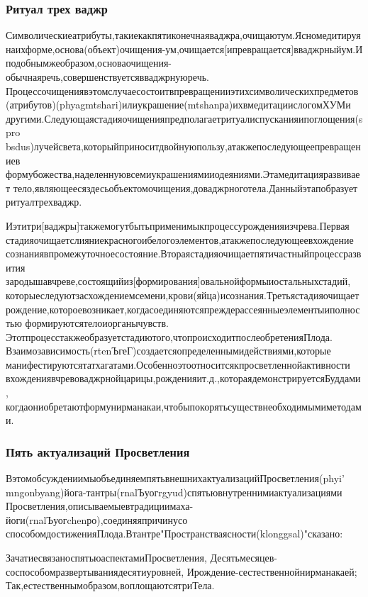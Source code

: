 {\subsubsection{Ритуал трех ваджр}

Символическиеатрибуты,такиекакпятиконечнаяваджра,очищаютум.Ясномедитируя
наихформе,основа(объект)очищения-ум,очищается[ипревращается]вваджрныйум.И
подобнымжеобразом,основаочищения-обычнаяречь,совершенствуетсявваджрнуюречь.
Процессочищениявэтомслучаесостоитвпревращенииэтихсимволическихпредметов
(атрибутов)(phyagmtshari)илиукрашение(mtshanра)ихвмедитациислогомХУМи
другими.Следующаястадияочищенияпредполагаетритуалиспусканияипоглощения(spro
bsdus)лучейсвета,которыйприноситдвойнуюпользу,атакжепоследующеепревращениев
формубожества,наделеннуювсемиукрашениямииодеяниями.Этамедитацияразвивает
тело,являющеесяздесьобъектомочищения,доваджрноготела.Данныйэтапобразует
ритуалтрехваджр.

Иэтитри[ваджры]такжемогутбытьприменимыкпроцессурожденияизчрева.Первая
стадияочищаетслияниекрасногоибелогоэлементов,атакжепоследующеевхождение
сознаниявпромежуточноесостояние.Втораястадияочищаетпятичастныйпроцессразвития
зародышавчреве,состоящийиз[формирования]овальнойформыиостальныхстадий,
которыеследуютзасхождениемсемени,крови(яйца)исознания.Третьястадияочищает
рождение,котороевозникает,когдасоединяютсяпреждерассеянныеэлементыиполностью
формируютсятелоиорганычувств.
Этотпроцесстакжеобразуетстадиютого,чтопроисходитпослеобретенияПлода.
Взаимозависимость(rtenЪгеГ)создаетсяопределеннымидействиями,которые
манифестируютсятатхагатами.Особенноэтоотноситсякпросветленнойактивности
вхождениявчревоваджрнойцарицы,рожденияит.д.,котораядемонстрируетсяБуддами,
когдаониобретаютформунирманакаи,чтобыпокорятьсуществнеобходимымиметодами.

\subsubsection{Пять актуализаций Просветления}

ВэтомобсуждениимыобъединяемпятьвнешнихактуализацийПросветления(phyi'
mngonbyang)йога-тантры(rnalЪуогrgyud)спятьювнутреннимиактуализациями
Просветления,описываемыевтрадициимаха-йоги(rnalЪуогchenро),соединяяпричинусо
способомдостиженияПлода.Втантре"Пространстваясности(klonggsal)"сказано:

ЗачатиесвязаноспятьюаспектамиПросветления,
Десятьмесяцев-соспособомразвертываниядесятиуровней,
Ирождение-сестественнойнирманакаей;
Так,естественнымобразом,воплощаютсятриТела.

}

